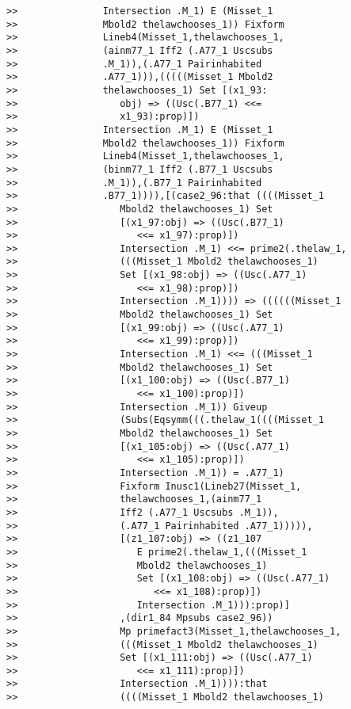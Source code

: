 \documentclass[12pt]{article}
\begin{document}
\begin{verbatim}
>>               Intersection .M_1) E (Misset_1
>>               Mbold2 thelawchooses_1)) Fixform
>>               Lineb4(Misset_1,thelawchooses_1,
>>               (ainm77_1 Iff2 (.A77_1 Uscsubs
>>               .M_1)),(.A77_1 Pairinhabited
>>               .A77_1))),(((((Misset_1 Mbold2
>>               thelawchooses_1) Set [(x1_93:
>>                  obj) => ((Usc(.B77_1) <<=
>>                  x1_93):prop)])
>>               Intersection .M_1) E (Misset_1
>>               Mbold2 thelawchooses_1)) Fixform
>>               Lineb4(Misset_1,thelawchooses_1,
>>               (binm77_1 Iff2 (.B77_1 Uscsubs
>>               .M_1)),(.B77_1 Pairinhabited
>>               .B77_1)))),[(case2_96:that ((((Misset_1
>>                  Mbold2 thelawchooses_1) Set
>>                  [(x1_97:obj) => ((Usc(.B77_1)
>>                     <<= x1_97):prop)])
>>                  Intersection .M_1) <<= prime2(.thelaw_1,
>>                  (((Misset_1 Mbold2 thelawchooses_1)
>>                  Set [(x1_98:obj) => ((Usc(.A77_1)
>>                     <<= x1_98):prop)])
>>                  Intersection .M_1)))) => ((((((Misset_1
>>                  Mbold2 thelawchooses_1) Set
>>                  [(x1_99:obj) => ((Usc(.A77_1)
>>                     <<= x1_99):prop)])
>>                  Intersection .M_1) <<= (((Misset_1
>>                  Mbold2 thelawchooses_1) Set
>>                  [(x1_100:obj) => ((Usc(.B77_1)
>>                     <<= x1_100):prop)])
>>                  Intersection .M_1)) Giveup
>>                  (Subs(Eqsymm(((.thelaw_1((((Misset_1
>>                  Mbold2 thelawchooses_1) Set
>>                  [(x1_105:obj) => ((Usc(.A77_1)
>>                     <<= x1_105):prop)])
>>                  Intersection .M_1)) = .A77_1)
>>                  Fixform Inusc1(Lineb27(Misset_1,
>>                  thelawchooses_1,(ainm77_1
>>                  Iff2 (.A77_1 Uscsubs .M_1)),
>>                  (.A77_1 Pairinhabited .A77_1))))),
>>                  [(z1_107:obj) => ((z1_107
>>                     E prime2(.thelaw_1,(((Misset_1
>>                     Mbold2 thelawchooses_1)
>>                     Set [(x1_108:obj) => ((Usc(.A77_1)
>>                        <<= x1_108):prop)])
>>                     Intersection .M_1))):prop)]
>>                  ,(dir1_84 Mpsubs case2_96))
>>                  Mp primefact3(Misset_1,thelawchooses_1,
>>                  (((Misset_1 Mbold2 thelawchooses_1)
>>                  Set [(x1_111:obj) => ((Usc(.A77_1)
>>                     <<= x1_111):prop)])
>>                  Intersection .M_1)))):that
>>                  ((((Misset_1 Mbold2 thelawchooses_1)

\end{verbatim}
\end{document}
